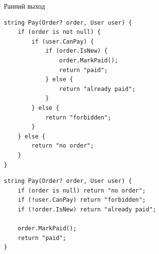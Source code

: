 \documentclass[aspectratio=169,10pt,t]{beamer}
\begin{document}
\begin{frame}[fragile]{Ранний выход}
  \slidetop
  \begin{minipage}[t]{0.45\textwidth}
    \par\vspace{0.5em}
\begin{lstlisting}[style=csharp,basicstyle=\ttfamily\fontsize{6.8}{7.9}\selectfont]
string Pay(Order? order, User user) {
    if (order is not null) {
        if (user.CanPay) {
            if (order.IsNew) {
                order.MarkPaid();
                return "paid";
            } else {
                return "already paid";
            }
        } else {
            return "forbidden";
        }
    } else {
        return "no order";
    }
}
\end{lstlisting}
  \end{minipage}\hfill
  \begin{minipage}[t]{0.51\textwidth}
    \par\vspace{0.5em}
\begin{lstlisting}[style=csharp,basicstyle=\ttfamily\fontsize{6.8}{7.9}\selectfont]
string Pay(Order? order, User user) {
    if (order is null) return "no order";
    if (!user.CanPay) return "forbidden";
    if (!order.IsNew) return "already paid";

    order.MarkPaid();
    return "paid";
}
\end{lstlisting}
    \vspace{0.8em}
  \end{minipage}
\end{frame}
\end{document}
